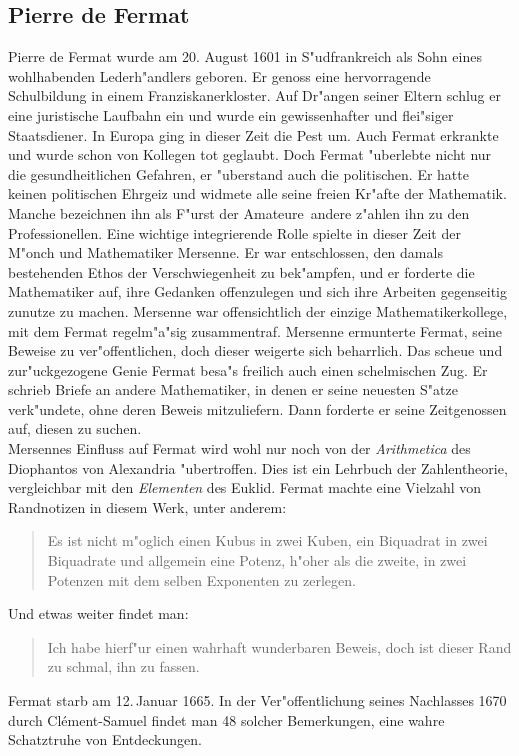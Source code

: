 \documentclass[11pt]{article}
\begin{document}
\subsection*{Pierre de Fermat}
Pierre de Fermat wurde am 20. August 1601 in S"udfrankreich als Sohn eines 
wohlhabenden Lederh"andlers geboren. Er genoss eine hervorragende Schulbildung in einem Franziskanerkloster. Auf Dr"angen seiner Eltern
schlug er eine juristische Laufbahn ein und wurde ein gewissenhafter und
flei"siger Staatsdiener. In Europa ging in dieser Zeit die Pest um. Auch
Fermat erkrankte und wurde schon von Kollegen tot geglaubt. Doch Fermat
"uberlebte nicht nur die gesundheitlichen Gefahren, er "uberstand auch
die politischen. Er hatte keinen politischen Ehrgeiz und 
widmete alle seine freien Kr"afte der Mathematik. Manche bezeichnen ihn als
\glqq F"urst der Amateure\grqq\ andere z"ahlen ihn zu den Professionellen.
Eine wichtige integrierende Rolle spielte in dieser Zeit der M"onch
und Mathematiker Mersenne. Er war entschlossen, den damals bestehenden
Ethos der Verschwiegenheit zu bek"ampfen, und er forderte die Mathematiker
auf, ihre Gedanken offenzulegen und sich ihre Arbeiten gegenseitig zunutze zu
machen. Mersenne war offensichtlich der einzige Mathematikerkollege, mit
dem Fermat regelm"a"sig zusammentraf. Mersenne ermunterte Fermat, seine Beweise
zu ver"offentlichen, doch dieser weigerte sich beharrlich. Das scheue
und zur"uckgezogene Genie Fermat besa"s freilich auch einen schelmischen
Zug. Er schrieb Briefe an andere Mathematiker, in denen er seine neuesten
S"atze verk"undete, ohne deren Beweis mitzuliefern. Dann forderte er seine 
Zeitgenossen auf, diesen zu suchen. 
\\
Mersennes Einfluss auf Fermat wird wohl nur noch von der {\em Arithmetica}
des Diophantos von Alexandria "ubertroffen. Dies ist ein Lehrbuch der
Zahlentheorie, vergleichbar mit den {\em Elementen} des Euklid. Fermat
machte eine Vielzahl von Randnotizen in diesem Werk, unter anderem:
\begin{quote}
Es ist nicht m"oglich einen Kubus in zwei Kuben, ein Biquadrat in zwei
Biquadrate und allgemein eine Potenz, h"oher als die zweite, in zwei
Potenzen mit dem selben Exponenten zu zerlegen.
\end{quote}
Und etwas weiter findet man:
\begin{quote}
Ich habe hierf"ur einen wahrhaft wunderbaren Beweis, doch ist dieser 
Rand zu schmal, ihn zu fassen.
\end{quote}
Fermat starb am 12.\,Januar 1665. 
In der Ver"offentlichung seines Nachlasses 1670 durch Cl{\'e}ment-Samuel findet man 48 solcher
Bemerkungen, eine wahre Schatztruhe von Entdeckungen.
\end{document}
